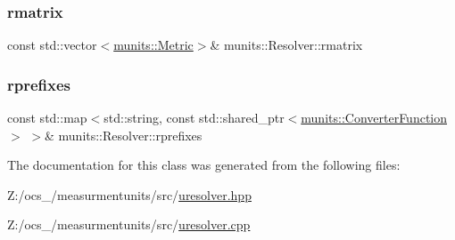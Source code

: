 \subsubsection{\texorpdfstring{rmatrix}{rmatrix}}
{\footnotesize\ttfamily const std\+::vector$<$\hyperlink{structmunits_1_1_metric}{munits\+::\+Metric}$>$\& munits\+::\+Resolver\+::rmatrix\hspace{0.3cm}{\ttfamily [protected]}}

\mbox{\label{classmunits_1_1_resolver_ad7d28db5df350e57ecda95aaae2a2e35}} 
\subsubsection{\texorpdfstring{rprefixes}{rprefixes}}
{\footnotesize\ttfamily const std\+::map$<$std\+::string, const std\+::shared\+\_\+ptr$<$\hyperlink{classmunits_1_1_converter_function}{munits\+::\+Converter\+Function}$>$ $>$\& munits\+::\+Resolver\+::rprefixes\hspace{0.3cm}{\ttfamily [protected]}}



The documentation for this class was generated from the following files\+:\begin{DoxyCompactItemize}
\item 
Z\+:/ocs\+\_/measurmentunits/src/\hyperlink{uresolver_8hpp}{uresolver.\+hpp}\item 
Z\+:/ocs\+\_/measurmentunits/src/\hyperlink{uresolver_8cpp}{uresolver.\+cpp}\end{DoxyCompactItemize}
